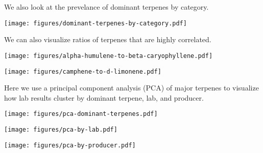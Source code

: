 \documentclass[../article.tex, 12pt]{subfiles}
\begin{document}
\newpage

We also look at the prevelance of dominant terpenes by category.

\vspace{1\baselineskip}

\begin{center}
\texttt{[image: figures/dominant-terpenes-by-category.pdf]}
\end{center}

\vspace{1\baselineskip}

We can also visualize ratios of terpenes that are highly correlated.

\vspace{0.5\baselineskip}

\begin{center}
\texttt{[image: figures/alpha-humulene-to-beta-caryophyllene.pdf]}
\end{center}

\vspace{0.5\baselineskip}

\begin{center}
\texttt{[image: figures/camphene-to-d-limonene.pdf]}
\end{center}

\newpage
Here we use a principal component analysis (PCA) of major terpenes to visualize how lab results cluster by dominant terpene, lab, and producer.

\vspace{2\baselineskip}

{\centering

\texttt{[image: figures/pca-dominant-terpenes.pdf]}

\vspace{1\baselineskip}

\texttt{[image: figures/pca-by-lab.pdf]}

\vspace{1\baselineskip}

\texttt{[image: figures/pca-by-producer.pdf]}

}



\end{document}
